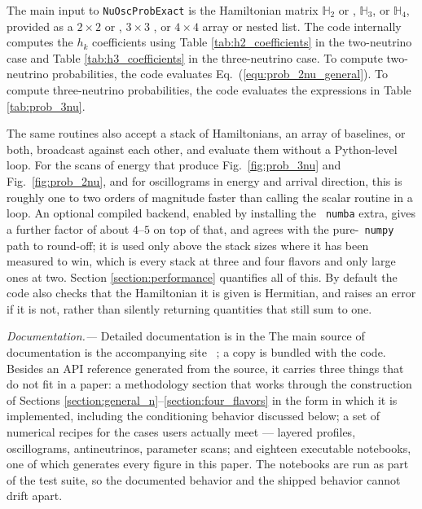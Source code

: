 \documentclass[final,5p,times,twocolumn]{elsarticle}
\newcommand{\eq}{Eq.}
\newcommand{\fig}{Fig.}
\newcommand{\equ}[1]{\eq~(\ref{equ:#1})}
\newcommand{\figu}[1]{\fig~\ref{fig:#1}}
\providecommand{\DIFaddtex}[1]{{\protect\color{blue} \sf #1}} %
\providecommand{\DIFdeltex}[1]{{\protect\color{red} \scriptsize #1}} %
\providecommand{\DIFaddbegin}{} %
\providecommand{\DIFaddend}{} %
\providecommand{\DIFdelbegin}{} %
\providecommand{\DIFdelend}{} %
\providecommand{\DIFadd}[1]{\DIFaddtex{#1}} %
\providecommand{\DIFdel}[1]{\DIFdeltex{#1}} %
\begin{document}
The main input to {\tt NuOscProbExact} is the Hamiltonian matrix $\mathbb{H}_2$\DIFdelbegin \DIFdel{or }\DIFdelend \DIFaddbegin \DIFadd{, }\DIFaddend $\mathbb{H}_3$, \DIFaddbegin \DIFadd{or $\mathbb{H}_4$, }\DIFaddend provided as a $2 \times 2$\DIFdelbegin \DIFdel{or }\DIFdelend \DIFaddbegin \DIFadd{, }\DIFaddend $3 \times 3$\DIFaddbegin \DIFadd{, or $4 \times 4$ array or nested }\DIFaddend list.  The code internally computes the $h_k$ coefficients using Table \ref{tab:h2_coefficients} in the two-neutrino case and Table \ref{tab:h3_coefficients} in the three-neutrino case.  To compute two-neutrino probabilities, the code evaluates \equ{prob_2nu_general}.  To compute three-neutrino probabilities, the code evaluates the expressions in Table \ref{tab:prob_3nu}.

\DIFaddbegin \DIFadd{The same routines also accept a stack of Hamiltonians, an array of baselines, or both, broadcast against each other, and evaluate them without a Python-level loop.  For the scans of energy that produce \figu{prob_3nu} and \figu{prob_2nu}, and for oscillograms in energy and arrival direction, this is roughly one to two orders of magnitude faster than calling the scalar routine in a loop.  An optional compiled backend, enabled by installing the }{\tt \DIFadd{numba}} \DIFadd{extra, gives a further factor of about $4$--$5$ on top of that, and agrees with the pure-}{\tt \DIFadd{numpy}} \DIFadd{path to round-off; it is used only above the stack sizes where it has been measured to win, which is every stack at three and four flavors and only large ones at two.  Section \ref{section:performance} quantifies all of this.  By default the code also checks that the Hamiltonian it is given is Hermitian, and raises an error if it is not, rather than silently returning quantities that still sum to one.
}

\DIFaddend \smallskip

{\it Documentation.---}  \DIFdelbegin \DIFdel{Detailed documentation is in the }\DIFdelend \DIFaddbegin \DIFadd{The main source of documentation is the accompanying site\ }\cite{NuOscProbExactDocs}\DIFadd{; a copy is bundled with the code.  Besides an API reference generated from the source, it carries three things that do not fit in a paper: a methodology section that works through the construction of Sections \ref{section:general_n}--\ref{section:four_flavors} in the form in which it is implemented, including the conditioning behavior discussed below; a set of numerical recipes for the cases users actually meet --- layered profiles, oscillograms, antineutrinos, parameter scans; and eighteen executable notebooks, one of which generates every figure in this paper.  The notebooks are run as part of the test suite, so the documented behavior and the shipped behavior cannot drift apart.
}
\end{document}
